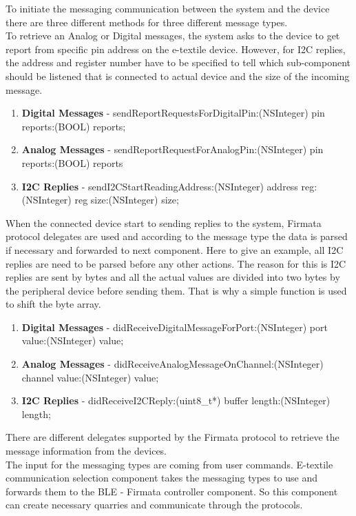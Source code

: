 To initiate the messaging communication between the system and the device there are three different methods for three different message types. \\

To retrieve an Analog or Digital messages, the system asks to the device to get report from specific pin address on the e-textile device. However, for I2C replies, the address and register number have to be specified to tell which sub-component should be listened that is connected to actual device and the size of the incoming message.

\begin{enumerate}
\item \textbf{Digital Messages} - sendReportRequestsForDigitalPin:(NSInteger) pin reports:(BOOL) reports;
\item \textbf{Analog Messages} - sendReportRequestForAnalogPin:(NSInteger) pin reports:(BOOL) reports
\item \textbf{I2C Replies} - sendI2CStartReadingAddress:(NSInteger) address reg:(NSInteger) reg size:(NSInteger) size;
\end{enumerate}

When the connected device start to sending replies to the system, Firmata protocol delegates are used and according to the message type the data is parsed if necessary and forwarded to next component. Here to give an example, all I2C replies are need to be parsed before any other actions. The reason for this is I2C replies are sent by bytes and all the actual values are divided into two bytes by the peripheral device before sending them. That is why a simple function is used to shift the byte array. 

\begin{enumerate}
\item \textbf{Digital Messages} - didReceiveDigitalMessageForPort:(NSInteger) port value:(NSInteger) value;
\item \textbf{Analog Messages} - didReceiveAnalogMessageOnChannel:(NSInteger) channel value:(NSInteger) value;
\item \textbf{I2C Replies} - didReceiveI2CReply:(uint8\_t*) buffer length:(NSInteger) length;
\end{enumerate}

There are different delegates supported by the Firmata protocol to retrieve the message information from the devices. \\

The input for the messaging types are coming from user commands. E-textile communication selection component takes the messaging types to use and forwards them to the BLE - Firmata controller component. So this component can create necessary quarries and communicate through the protocols. \\

